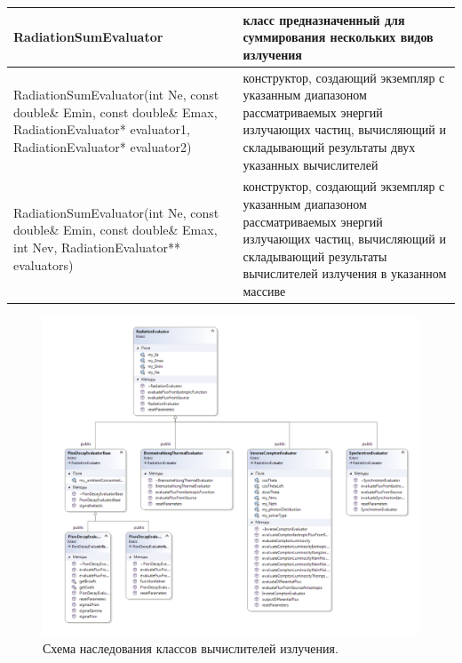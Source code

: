 \begin{small}
\begin{xtabular}{|p{0.5\textwidth}|p{0.5\textwidth}|}
		\hline
		\textbf{RadiationSumEvaluator} & класс предназначенный для суммирования нескольких видов излучения\\
		\hline
		RadiationSumEvaluator(int Ne, const double\& Emin, const double\& Emax, RadiationEvaluator* evaluator1, RadiationEvaluator* evaluator2) & конструктор, создающий экземпляр с указанным диапазоном рассматриваемых энергий излучающих частиц, вычисляющий и складывающий результаты двух указанных вычислителей \\
		\hline
		RadiationSumEvaluator(int Ne, const double\& Emin, const double\& Emax, int Nev, RadiationEvaluator** evaluators) & конструктор, создающий экземпляр с указанным диапазоном рассматриваемых энергий излучающих частиц, вычисляющий и складывающий результаты вычислителей излучения в указанном массиве\\
		\hline
	\end{xtabular}
\end{small}

\begin{figure}[h]
	\centering
	\includegraphics[width=10.5 cm]{./fig/radiationEvaluator.png} 
	\caption{Схема наследования классов вычислителей излучения.}
	\label{radiationEvaluators}
\end{figure}

